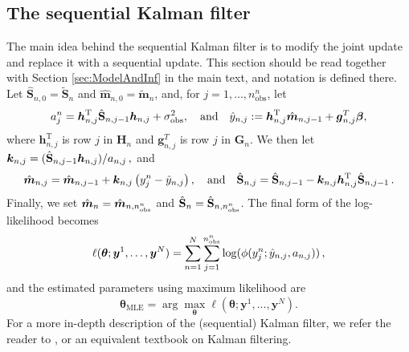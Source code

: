 \documentclass[12pt]{article} %
\begin{document}
\subsection{The sequential Kalman filter} \label{suppl:seq-Kalman-filter}

The main idea behind the sequential Kalman filter is to modify the joint update and replace it with a sequential update. This section should be read together with Section \ref{sec:ModelAndInf} in the main text, and notation is defined there. Let $\hat{\mathbf{S}}_{n,0} = \tilde{\mathbf{S}}_n$ and $\hat{\mathbf{m}}_{n,0} = \tilde{\mathbf{m}}_n$, and, for $j = 1, \ldots, n_{\mathrm{obs}}^n$, let
\begin{equation*}
    a_{j}^n = \boldsymbol{h}_{n,j}^\mathrm{T} \Hat{\mathbf{S}}_{n,j - 1} \boldsymbol{h}_{n,j} + \sigma_{\mathrm{obs}}^2, \quad \text{and} \quad
    \Hat{y}_{n,j} := \boldsymbol{h}_{n,j}^\mathrm{T} \Hat{\boldsymbol{m}}_{n,j-1} +\boldsymbol{g}_{n,j}^T
    \boldsymbol{\beta},
\end{equation*}
where $\boldsymbol{h}_{n,j}^\mathrm{T}$ is row $j$ in $\mathbf{H}_n$ and $\boldsymbol{g}_{n,j}^T$ is row $j$ in $\mathbf{G}_n$. We then let
\(
    \boldsymbol{k}_{n,j} = (\Hat{\mathbf{S}}_{n,j-1} \boldsymbol{h}_{n,j})/a_{n,j} \, ,
\)
and 
\begin{equation*}
    \Hat{\boldsymbol{m}}_{n,j} = \Hat{\boldsymbol{m}}_{n,j - 1} + \boldsymbol{k}_{n,j} \left(y_j^n - \Hat{y}_{n,j}\right), \quad \text{and}\quad
    \Hat{\mathbf{S}}_{n,j} = \Hat{\mathbf{S}}_{n,j - 1} - \boldsymbol{k}_{n,j} \boldsymbol{h}_{n,j}^\mathrm{T} \Hat{\mathbf{S}}_{n,j - 1}  \, .
\end{equation*} 
Finally, we set $\Hat{\boldsymbol{m}}_n = \Hat{\boldsymbol{m}}_{n,n_{\mathrm{obs}}^n}$ and $\Hat{\mathbf{S}}_n = \Hat{\mathbf{S}}_{n, n_{\mathrm{obs}}^n}$. The final form of the log-likelihood becomes
\begin{equation*}
    \ell(\boldsymbol{\theta}; \boldsymbol{y}^1,\ldots,\boldsymbol{y}^N) = \sum_{n = 1}^N \sum_{j = 1}^{n_{\mathrm{obs}}^n} \log(\phi(y_j^n; \Hat{y}_{n,j}, a_{n,j})) \, ,
\end{equation*}
and the estimated parameters using maximum likelihood are
\[
    \hat{\boldsymbol{\theta}}_{\mathrm{MLE}}=\arg\max_{\boldsymbol{\theta}}  \ell(\boldsymbol{\theta}; \boldsymbol{y}^1,\ldots,\boldsymbol{y}^N).
\]
For a more in-depth description of the (sequential) Kalman filter, we refer the reader to \cite{Anderson2005-hn}, or an equivalent textbook on Kalman filtering.
\end{document}

